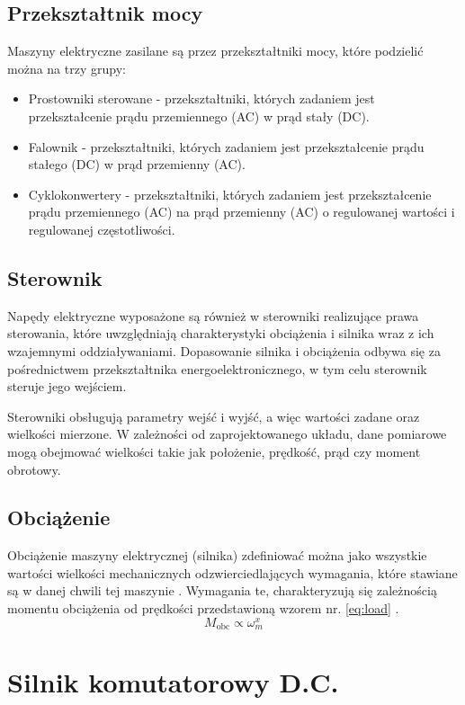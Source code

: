 \subsection{Przekształtnik mocy}
Maszyny elektryczne zasilane są przez przekształtniki mocy, które podzielić można na trzy grupy\cite{krishnan2001electric}:
\begin{itemize}[label=$\bullet$, align=left, labelwidth=1.5em, leftmargin=!]
    \item Prostowniki sterowane - przekształtniki, których zadaniem jest przekształcenie prądu przemiennego (AC) w prąd stały (DC).
    \item Falownik - przekształtniki, których zadaniem jest przekształcenie prądu stałego (DC) w prąd przemienny (AC).
    \item Cyklokonwertery - przekształtniki, których zadaniem jest przekształcenie prądu przemiennego (AC) na prąd przemienny (AC) o regulowanej wartości i regulowanej częstotliwości.
\end{itemize}
\subsection{Sterownik}
Napędy elektryczne wyposażone są również w sterowniki realizujące prawa sterowania, które uwzględniają charakterystyki obciążenia i silnika wraz z ich wzajemnymi oddziaływaniami.
Dopasowanie silnika i obciążenia odbywa się za pośrednictwem przekształtnika energoelektronicznego, w tym celu sterownik steruje jego wejściem\cite{krishnan2001electric}.\par
Sterowniki obsługują parametry wejść i wyjść, a więc wartości zadane oraz wielkości mierzone.
W zależności od zaprojektowanego układu, dane pomiarowe mogą obejmować wielkości takie jak położenie, prędkość, prąd czy moment obrotowy\cite{krishnan2001electric}\cite{lastowiecki2011napkedy}.
\subsection{Obciążenie}
Obciążenie maszyny elektrycznej (silnika) zdefiniować można jako wszystkie wartości wielkości mechanicznych odzwierciedlających wymagania, które stawiane są w danej chwili tej maszynie \cite{IEC60034-1_2022}.
Wymagania te, charakteryzują się zależnością momentu obciążenia od prędkości przedstawioną wzorem nr. \ref{eq:load} \cite{krishnan2001electric}.
\begin{equation}
    M_{\text{obc}} \propto \omega_m^x
    \label{eq:load}
\end{equation}

\section{Silnik komutatorowy D.C.}
